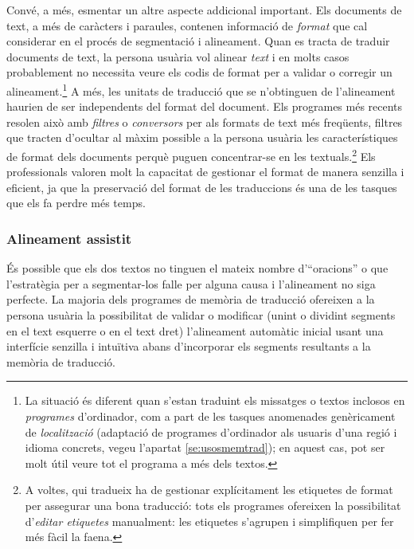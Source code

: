 Convé, a més, esmentar un altre aspecte addicional important. Els
documents de text, a més de caràcters i paraules, contenen informació
de \emph{format} que cal considerar en el procés de segmentació i
alineament.  Quan es tracta de traduir documents de text, la persona
usuària vol alinear \emph{text} i en molts casos probablement no
necessita veure els codis de format per a validar o corregir un
alineament.\footnote{La situació és diferent quan s'estan traduint els
  missatges o textos inclosos en \emph{programes} d'ordinador, com a
  part de les tasques anomenades genèricament de \emph{localització}
  (adaptació de programes d'ordinador als usuaris d'una regió i idioma
  concrets, vegeu l'apartat \ref{se:usosmemtrad}); en aquest cas, pot
  ser molt útil veure tot el programa a més dels textos.}  A més, les
unitats de traducció que se n'obtinguen de l'alineament haurien de ser
independents del format del document. Els programes més recents
resolen això amb \emph{filtres} o \emph{conversors} per als formats de
text més freqüents, filtres que tracten d'ocultar al màxim possible a
la persona usuària les característiques de format dels documents
perquè puguen concentrar-se en les textuals.\footnote{A voltes, qui
  tradueix ha de gestionar explícitament les etiquetes de format per
  assegurar una bona traducció: tots els programes ofereixen la
  possibilitat d'\emph{editar etiquetes} manualment: les etiquetes
  s'agrupen i simplifiquen per fer més fàcil la faena.} Els
professionals valoren molt la capacitat de gestionar el format de
manera senzilla i eficient, ja que la preservació del format de les
traduccions és una de les tasques que els fa perdre més temps.

\subsubsection{Alineament assistit}

És possible que els dos textos no tinguen el mateix nombre
d'``oracions'' o que l'estratègia per a segmentar-los falle per alguna
causa i l'alineament no siga perfecte. La majoria dels programes de
memòria de traducció ofereixen a la persona usuària la possibilitat de
validar o modificar (unint o dividint segments en el text esquerre o
en el text dret) l'alineament automàtic inicial usant una interfície
senzilla i intuïtiva abans d'incorporar els segments resultants a la
memòria de traducció.

